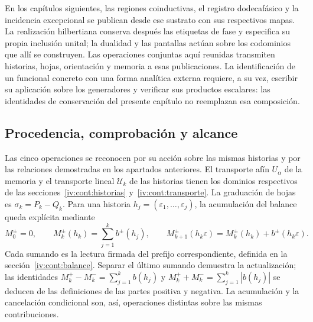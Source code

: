 En los capítulos siguientes, las regiones coinductivas, el registro dodecafásico y la incidencia excepcional se publican desde ese sustrato con sus respectivos mapas. La realización hilbertiana conserva después las etiquetas de fase y especifica su propia inclusión unital; la dualidad y las pantallas actúan sobre los codominios que allí se construyen. Las operaciones conjuntas aquí reunidas transmiten historias, hojas, orientación y memoria a esas publicaciones. La identificación de un funcional concreto con una forma analítica externa requiere, a su vez, escribir su aplicación sobre los generadores y verificar sus productos escalares: las identidades de conservación del presente capítulo no reemplazan esa composición.

\subsection{Procedencia, comprobación y alcance}
\label{iv:cont:mapa-correlativo}
Las cinco operaciones se reconocen por su acción sobre las mismas
historias y por las relaciones demostradas en los apartados anteriores.
El transporte afín \(U_\alpha\) de la memoria y el transporte
lineal \(\mathcal U_k\) de las historias tienen los dominios
respectivos de las secciones~\ref{iv:cont:historias}
y~\ref{iv:cont:transporte}. La graduación de hojas es
\(\sigma_k=P_k-Q_k\). Para una historia
\(h_j=(\varepsilon_1,\ldots,\varepsilon_j)\), la acumulación del
balance queda explícita mediante
\[
 M_0^\pm=0,\qquad
 M_k^\pm(h_k)=\sum_{j=1}^k b^\pm(h_j),\qquad
 M_{k+1}^\pm(h_k\varepsilon)
 =M_k^\pm(h_k)+b^\pm(h_k\varepsilon).
\]
Cada sumando es la lectura firmada del prefijo correspondiente,
definida en la sección~\ref{iv:cont:balance}. Separar el último
sumando demuestra la actualización; las identidades
\(M_k^+-M_k^-=\sum_{j=1}^kb(h_j)\) y
\(M_k^++M_k^-=\sum_{j=1}^k|b(h_j)|\) se deducen de las
definiciones de las partes positiva y negativa. La acumulación y la
cancelación condicional son, así, operaciones distintas sobre las
mismas contribuciones.

